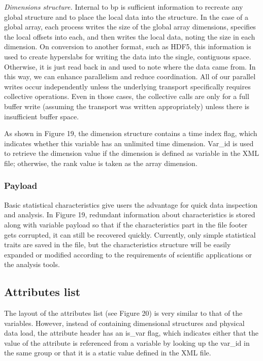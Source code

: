 \emph{Dimensions structure.} 
Internal to bp is sufficient information to recreate any global structure and to 
place the local data into the structure. In the case of a global array, each process 
writes the size of the global array dimensions, specifies the local offsets into 
each, and then writes the local data, noting the size in each dimension. On conversion 
to another format, such as HDF5, this information is used to create hyperslabs 
for writing the data into the single, contiguous space. Otherwise, it is just read 
back in and used to note where the data came from. In this way, we can enhance 
parallelism and reduce coordination. All of our parallel writes occur independently 
unless the underlying transport specifically requires collective operations. Even 
in those cases, the collective calls are only for a full buffer write (assuming 
the transport was written appropriately) unless there is insufficient buffer space. 

As shown in Figure 19, the dimension structure contains a time index flag, which 
indicates whether this variable has an unlimited time dimension. Var\_id is used 
to retrieve the dimension value if the dimension is defined as variable in the 
XML file; otherwise, the rank value is taken as the array dimension.  

\subsubsection{Payload}

Basic statistical characteristics give users the advantage for quick data inspection 
and analysis. In Figure 19, redundant information about characteristics is stored 
along with variable payload so that if the characteristics part in the file footer 
gets corrupted, it can still be recovered quickly. Currently, only simple statistical 
traits are saved in the file, but the characteristics structure will be easily 
expanded or modified according to the requirements of scientific applications or 
the analysis tools. 

\subsection{Attributes list}

The layout of the attributes list (see Figure 20) is very similar to that of the 
variables. However, instead of containing dimensional structures and physical data 
load, the attribute header has an is\_var flag, which indicates either that the 
value of the attribute is referenced from a variable by looking up the var\_id 
in the same group or that it is a static value defined in the XML file. 

